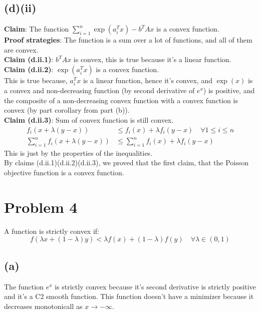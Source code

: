 \documentclass[]{article}
\begin{document}
\subsection*{(d)(ii)}
    \textbf{Claim}: The function $\sum_{i = 1}^n\exp(a_i^Tx) - b^TAx$ is a convex function.
    \\
    \textbf{Proof strategies}: The function is a sum over a lot of functions, and all of them are convex.
    \\
    \textbf{Claim (d.ii.1)}: $b^TAx$ is convex, this is true because it's a linear function.
    \\
    \textbf{Claim (d.ii.2)}: $\exp(a_i^Tx)$ is a convex function.
    \\
    This is true because, $a_i^Tx$ is a linear function, hence it's convex, and $\exp(x)$ is a convex and non-decreasing function (by second derivative of $e^x$) is positive, and the composite of a non-decreasing convex function with a convex function is convex (by part corollary from part (b)).
    \\
    \textbf{Claim (d.ii.3)}: Sum of convex function is still convex.
    \\
    \begin{align*}
        f_i(x + \lambda(y - x)) &\le f_i(x) + \lambda f_i(y - x)  \quad
        \forall 1 \le i \le n
        \\
        \sum_{i = 1}^n f_i(x + \lambda(y - x)) &\le \sum_{i = 1}^n f_i(x) + \lambda f_i(y - x)
    \end{align*}
    This is just by the properties of the inequalities.
    \\
    By claims (d.ii.1)(d.ii.2)(d.ii.3), we proved that the first claim, that the Poisson objective function is a convex function.


\newpage
\section*{Problem 4}
    A function is strictly convex if:
    \begin{equation*}\label{eqn:def1}\tag{def1}
        f(\lambda x + (1 - \lambda)y) < \lambda f(x) + (1 - \lambda )f(y) \quad \forall \lambda \in (0, 1)
    \end{equation*}

\subsection*{(a)}
    The function $e^x$ is strictly convex because it's second derivative is strictly positive and it's a C2 smooth function. This function doesn't have a minimizer because it decreases monotonicall as $x\rightarrow -\infty$.
\end{document}
